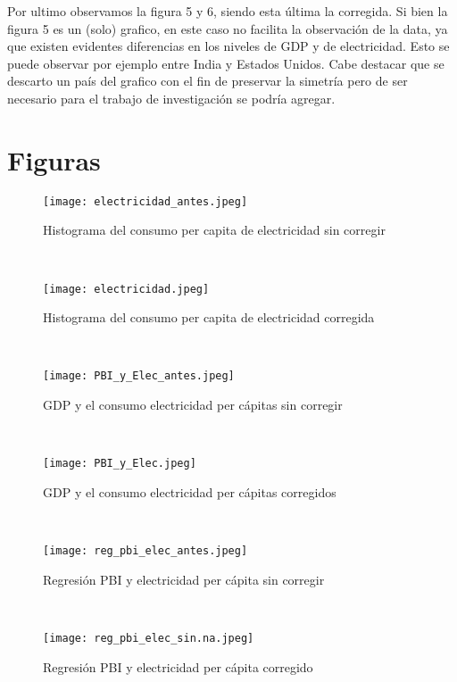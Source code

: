 \documentclass{article}
\begin{document}
Por ultimo observamos la figura 5 y 6, siendo esta última la corregida. Si bien la figura 5 es un (solo) grafico, en este caso no  facilita la observación de la data, ya que existen evidentes diferencias en los niveles de GDP y de electricidad. Esto se puede observar por ejemplo entre India y Estados Unidos. Cabe destacar que se descarto un país del grafico con el fin de preservar la simetría pero de ser necesario para el trabajo de investigación se podría agregar.





\section{Figuras}

\begin{figure}[htbp]
\centerline{\texttt{[image: electricidad\_antes.jpeg]}}
\caption{Histograma del consumo per capita de electricidad sin corregir}
\label{fig}
\end{figure}\\


\begin{figure}[htbp]
\centerline{\texttt{[image: electricidad.jpeg]}}
\caption{Histograma del consumo per capita de electricidad corregida}
\label{fig}
\end{figure}\\


\begin{figure}[htbp]
\centerline{\texttt{[image: PBI\_y\_Elec\_antes.jpeg]}}
\caption{GDP y el consumo electricidad per cápitas sin corregir}
\label{fig}
\end{figure}\\


\begin{figure}[htbp]
\centerline{\texttt{[image: PBI\_y\_Elec.jpeg]}}
\caption{GDP y el consumo electricidad per cápitas corregidos}
\label{fig}
\end{figure}\\



\begin{figure}[htbp]
\centerline{\texttt{[image: reg\_pbi\_elec\_antes.jpeg]}}
\caption{Regresión PBI  y electricidad per cápita sin corregir}
\label{fig}
\end{figure}\\


\begin{figure}[htbp]
\centerline{\texttt{[image: reg\_pbi\_elec\_sin.na.jpeg]}}
\caption{Regresión PBI  y electricidad per cápita corregido}
\label{fig}
\end{figure}\\











\maketitle
\end{document}
